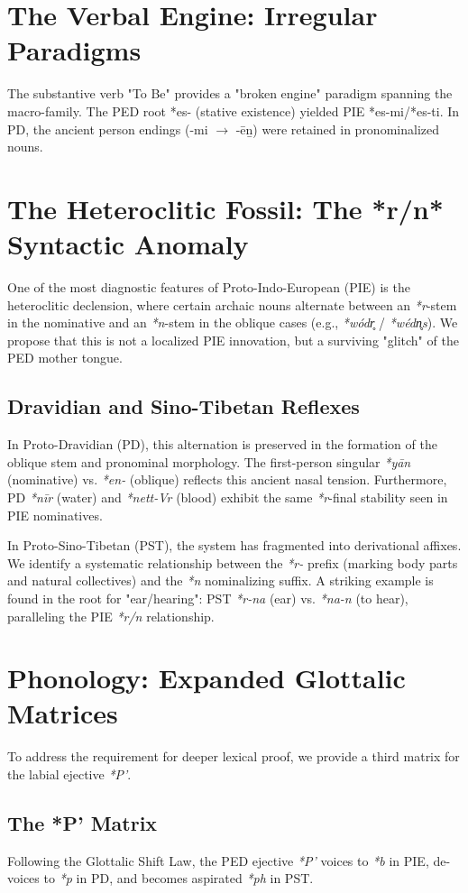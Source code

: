 \documentclass[11pt,a4paper]{article}
\begin{document}
\section{The Verbal Engine: Irregular Paradigms}
The substantive verb "To Be" provides a "broken engine" paradigm spanning the macro-family. The PED root *es- (stative existence) yielded PIE *es-mi/*es-ti. In PD, the ancient person endings (-mi $\rightarrow$ -ēṉ) were retained in pronominalized nouns.

\section{The Heteroclitic Fossil: The *r/n* Syntactic Anomaly}
One of the most diagnostic features of Proto-Indo-European (PIE) is the heteroclitic declension, where certain archaic nouns alternate between an \textit{*r}-stem in the nominative and an \textit{*n}-stem in the oblique cases (e.g., \textit{*wódr̥} / \textit{*wédn̥s}). We propose that this is not a localized PIE innovation, but a surviving "glitch" of the PED mother tongue.

\subsection{Dravidian and Sino-Tibetan Reflexes}
In Proto-Dravidian (PD), this alternation is preserved in the formation of the oblique stem and pronominal morphology. The first-person singular \textit{*yān} (nominative) vs. \textit{*en-} (oblique) reflects this ancient nasal tension. Furthermore, PD \textit{*nīr} (water) and \textit{*nett-Vr} (blood) exhibit the same \textit{*r}-final stability seen in PIE nominatives.

In Proto-Sino-Tibetan (PST), the system has fragmented into derivational affixes. We identify a systematic relationship between the \textit{*r-} prefix (marking body parts and natural collectives) and the \textit{*n} nominalizing suffix. A striking example is found in the root for "ear/hearing": PST \textit{*r-na} (ear) vs. \textit{*na-n} (to hear), paralleling the PIE \textit{*r/n} relationship.

\section{Phonology: Expanded Glottalic Matrices}
To address the requirement for deeper lexical proof, we provide a third matrix for the labial ejective \textit{*P'}.

\subsection{The *P' Matrix}
Following the Glottalic Shift Law, the PED ejective \textit{*P'} voices to \textit{*b} in PIE, de-voices to \textit{*p} in PD, and becomes aspirated \textit{*ph} in PST.
\end{document}
